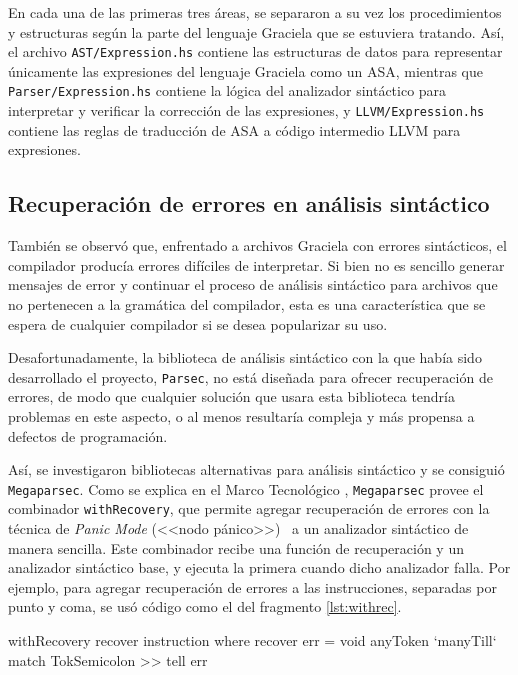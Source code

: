 En cada una de las primeras tres áreas, se separaron a su vez los procedimientos
y estructuras según la parte del lenguaje Graciela que se estuviera tratando.
Así, el archivo \texttt{AST/Expression.hs} contiene las estructuras de datos
para representar únicamente las expresiones del lenguaje Graciela como un
\textsc{ASA}, mientras que \texttt{Parser/Expression.hs} contiene la lógica del
analizador sintáctico para interpretar y verificar la corrección de las
expresiones, y \texttt{LLVM/Expression.hs} contiene las reglas de traducción de
\textsc{ASA} a código intermedio \textsc{LLVM} para expresiones.

\subsection{Recuperación de errores en análisis sintáctico}

También se observó que, enfrentado a archivos Graciela con errores sintácticos,
el compilador producía errores difíciles de interpretar. Si bien no es sencillo
generar mensajes de error y continuar el proceso de análisis sintáctico para
archivos que no pertenecen a la gramática del compilador, esta es una
característica que se espera de cualquier compilador si se desea popularizar su
uso.

Desafortunadamente, la biblioteca de análisis sintáctico con la que había sido
desarrollado el proyecto, \texttt{Parsec}, no está diseñada para ofrecer
recuperación de errores, de modo que cualquier solución que usara esta
biblioteca tendría problemas en este aspecto, o al menos resultaría compleja y
más propensa a defectos de programación.

Así, se investigaron bibliotecas alternativas para análisis sintáctico y se
consiguió \texttt{Megaparsec}. Como se explica en el Marco Tecnológico
, \texttt{Megaparsec} provee el
combinador \texttt{withRecovery}, que permite agregar recuperación de errores
con la técnica de \textit{Panic Mode} (<<nodo pánico>>)~\cite{aho2} a un
analizador sintáctico de manera sencilla. Este combinador recibe una función de
recuperación y un analizador sintáctico base, y ejecuta la primera cuando dicho
analizador falla. Por ejemplo, para agregar recuperación de errores a las
instrucciones, separadas por punto y coma, se usó código como el del fragmento
\ref{lst:withrec}.

\begin{haskellcode}[caption=Uso de \texttt{withRecovery}, label=lst:withrec]
withRecovery recover instruction
  where
    recover err = void anyToken `manyTill` match TokSemicolon
               >> tell err
\end{haskellcode}

